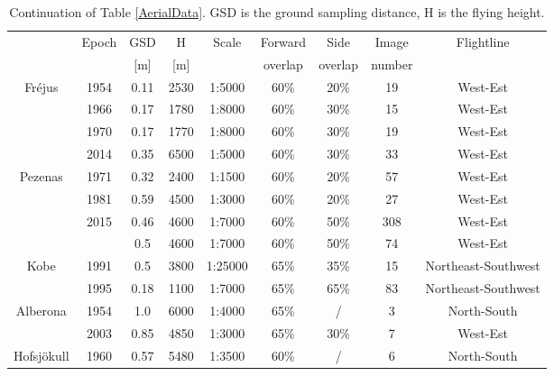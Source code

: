 \begin{table}[htbp]
	\centering
	\begin{tabular}{||c|c||c|c|c|c|c|c|c||}\hline
		& \multirow{2}{*}{Epoch} & GSD & H & \multirow{2}{*}{Scale} & Forward & Side & Image & \multirow{2}{*}{Flightline} \\
		&  & [m] & [m] & & overlap & overlap & number & \\\hline\hline
		
		\multirow{4}{*}{Fr{\'e}jus} & 1954 & 0.11 & 2530 & 1:5000 & 60\% & 20\% & 19 & West-Est \\
		& 1966 & 0.17 & 1780 & 1:8000  & 60\% & 30\% & 15 & West-Est \\
		& 1970 & 0.17 & 1770 & 1:8000  & 60\% & 30\% & 19 & West-Est \\
		& 2014 & 0.35 & 6500 & 1:5000  & 60\% & 30\% & 33 & West-Est \\\hline\hline
		
		\multirow{4}{*}{Pezenas} & 1971 & 0.32 & 2400 & 1:1500 &  60\% &    20\% &  57 & West-Est \\
		& 1981 & 0.59 & 4500 & 1:3000  & 60\% & 20\% & 27 & West-Est \\
		& \multirow{2}{*}{2015} & 0.46 & 4600 & 1:7000  & 60\% & 50\% & 308 & West-Est \\
		&  & 0.5 & 4600 & 1:7000 & 60\% & 50\% & 74 & West-Est \\\hline\hline
		
		\multirow{2}{*}{Kobe}& 1991 & 0.5 & 3800 & 1:25000 & 65\% &    35\% &  15 &  Northeast-Southwest \\
		& 1995 & 0.18 & 1100 & 1:7000 & 65\% & 65\% &  83 &  Northeast-Southwest \\\hline\hline
		
		\multirow{2}{*}{Alberona}& 1954 & 1.0 & 6000 & 1:4000  & 65\% & / & 3 & North-South \\
		& 2003 & 0.85 & 4850 & 1:3000  & 65\% & 30\% & 7 & West-Est \\\hline\hline
		
		Hofsjökull & 1960 & 0.57 & 5480 & 1:3500  & 60\% & / & 6 & North-South \\\hline
	\end{tabular}
	\caption{Continuation of Table \ref{AerialData}. GSD is the ground sampling distance, H is the flying height.}
	\label{AerialDataContinue}
\end{table}

